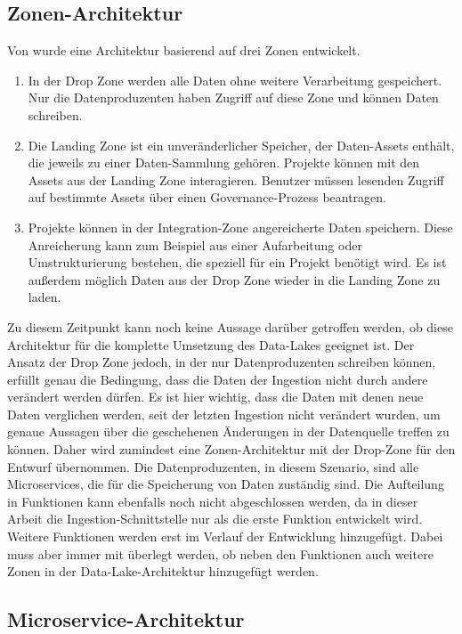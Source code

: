 \subsection{Zonen-Architektur}
Von \textcite{ingestion_02} wurde eine Architektur basierend auf drei Zonen entwickelt.
\begin{enumerate}
    \item In der Drop Zone werden alle Daten ohne weitere Verarbeitung gespeichert.
          Nur die Datenproduzenten haben Zugriff auf diese Zone und können Daten schreiben.
    \item Die Landing Zone ist ein unveränderlicher Speicher, der Daten-Assets enthält, die jeweils zu einer Daten-Sammlung gehören. Projekte können mit den Assets aus der Landing Zone interagieren.
          Benutzer müssen lesenden Zugriff auf bestimmte Assets über einen Governance-Prozess beantragen.
    \item Projekte können in der Integration-Zone angereicherte Daten speichern.
          Diese Anreicherung kann zum Beispiel aus einer Aufarbeitung oder Umstrukturierung bestehen, die speziell für ein Projekt benötigt wird.
          Es ist außerdem möglich Daten aus der Drop Zone wieder in die Landing Zone zu laden.
\end{enumerate}
Zu diesem Zeitpunkt kann noch keine Aussage darüber getroffen werden, ob diese Architektur für die komplette Umsetzung des Data-Lakes geeignet ist.
Der Ansatz der Drop Zone jedoch, in der nur Datenproduzenten schreiben können, erfüllt genau die Bedingung, dass die Daten der Ingestion nicht durch andere verändert werden dürfen.
Es ist hier wichtig, dass die Daten mit denen neue Daten verglichen werden, seit der letzten Ingestion nicht verändert wurden, um genaue Aussagen über die geschehenen Änderungen in der Datenquelle treffen zu können.
Daher wird zumindest eine Zonen-Architektur mit der Drop-Zone für den Entwurf übernommen.
Die Datenproduzenten, in diesem Szenario, sind alle Microservices, die für die Speicherung von Daten zuständig sind.
Die Aufteilung in Funktionen kann ebenfalls noch nicht abgeschlossen werden, da in dieser Arbeit die Ingestion-Schnittstelle nur als die erste Funktion entwickelt wird.
Weitere Funktionen werden erst im Verlauf der Entwicklung hinzugefügt.
Dabei muss aber immer mit überlegt werden, ob neben den Funktionen auch weitere Zonen in der Data-Lake-Architektur hinzugefügt werden.

\subsection{Microservice-Architektur}
\label{sec:arch}

